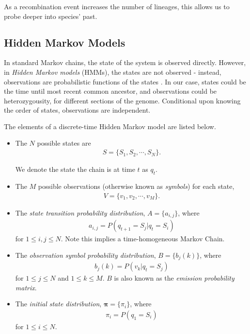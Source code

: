 \documentclass[12pt]{article}
\begin{document}
As a recombination event increases the number of lineages, this allows us to probe deeper into species' past.

\subsection{Hidden Markov Models}\label{ssec:HMM}
In standard Markov chains, the state of the system is observed directly. However, in \emph{Hidden Markov models} (HMMs), the states are not observed - instead, observations are probabilistic functions of the states \cite{rabiner1989tutorial}. In our case, states could be the time until most recent common ancestor, and observations could be heterozygousity, for different sections of the genome. Conditional upon knowing the order of states, observations are independent.

The elements of a discrete-time Hidden Markov model are listed below.
\begin{itemize}
\item The $N$ possible states are
  \begin{eqnarray*}
    S=\{S_1,S_2,\cdots,S_N\}.
  \end{eqnarray*}

  We denote the state the chain is at time $t$ as $q_t$.
\item The $M$ possible observations (otherwise known as \emph{symbols}) for each state,
    \begin{eqnarray*}
    V=\{v_1,v_2,\cdots,v_M\}.
  \end{eqnarray*}
  \item The \emph{state transition probability distribution}, $A=\{a_{i,j}\}$, where  
\begin{eqnarray*}
a_{i,j}=P(q_{t+1}=S_j|q_t=S_i)
\end{eqnarray*}
for $1\le i,j \le N$. Note this implies a time-homogeneous Markov Chain.
    
\item The \emph{observation symbol probability distribution}, $B=\{b_j(k)\}$, where
\begin{eqnarray*}
b_j(k)=P(v_k|q_t=S_j)
\end{eqnarray*}
for $1\le j\le N$ and $1\le k \le M$. $B$ is also known as the \emph{emission probability matrix}.
\item The \emph{initial state distribution}, $\bm{\pi}=\{\pi_i\}$, where
  \begin{eqnarray*}
    \pi_i=P(q_1=S_i)
  \end{eqnarray*}
for $1\le i\le N$.
\end{itemize}
\end{document}
